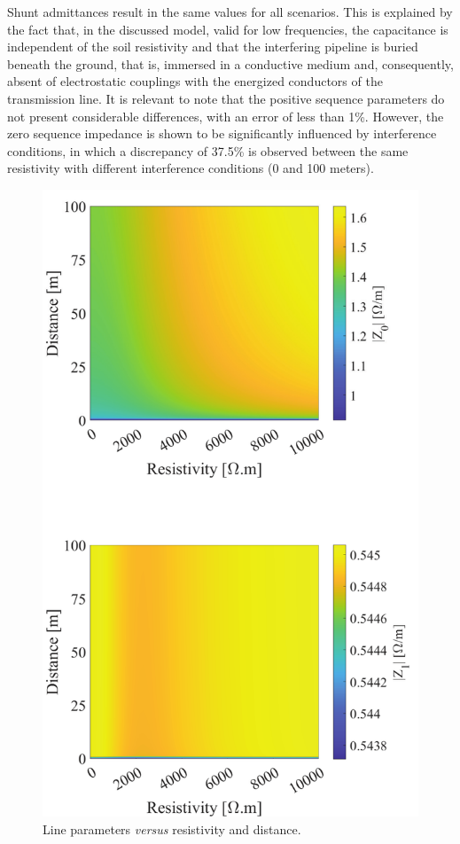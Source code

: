 \documentclass[conference]{IEEEtran}
\begin{document}
	Shunt admittances result in the same values for all scenarios. This is explained by the fact that, in the discussed model, valid for low frequencies, the capacitance is independent of the soil resistivity and that the interfering pipeline is buried beneath the ground, that is, immersed in a conductive medium and, consequently, absent of electrostatic couplings with the energized conductors of the transmission line. It is relevant to note that the positive sequence parameters do not present considerable differences, with an error of less than 1\%. However, the zero sequence impedance is shown to be significantly influenced by interference conditions, in which a discrepancy of 37.5\% is observed between the same resistivity with different interference conditions (0 and 100 meters). 
	
	
	\begin{figure}[hbt]
		\begin{center}
			\includegraphics[width=.8\columnwidth]{fig/Impedance2.pdf}
			\caption{Line parameters \textit{versus} resistivity and distance.}
			\label{fig:Impedance}
		\end{center}
	\end{figure}
	
\end{document}
